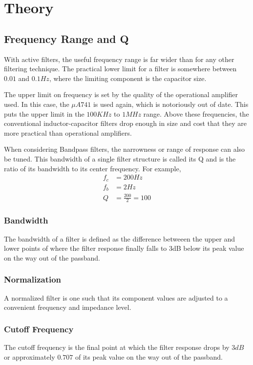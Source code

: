 \documentclass[12pt]{article}
\begin{document}
\section{Theory}
\subsection{Frequency Range and Q}
With active filters, the useful frequency range is far wider than for any other
filtering technique. The practical lower limit for a filter is somewhere between $0.01$ and $0.1Hz$, where the limiting component is the capacitor size.

The upper limit on frequency is set by the quality of the operational amplifier used. In this case, the $\mu A741$ is used again, which is notoriously out of date. This puts the upper limit in the $100KHz$ to $1MHz$ range. Above these frequencies, the conventional inductor-capacitor filters drop enough in size and cost that they are more practical than operational amplifiers.

When considering Bandpass filters, the narrowness or range of response can also be tuned. This bandwidth of a single filter structure is called its Q and is the ratio of its bandwidth to its center frequency. For example,
\begin{align*}
	f_c & = 200Hz               \\
	f_b & = 2Hz                 \\
	Q   & = \frac{200}{2} = 100
\end{align*}
\subsubsection{Bandwidth}
The bandwidth of a filter is defined as the difference betweeen the upper and lower points of where the filter response finally falls to 3dB below its peak value on the way out of the passband.

\subsubsection{Normalization}
A normalized filter is one such that its component values are adjusted to a convenient frequency and impedance level.

\subsubsection{Cutoff Frequency}
The cutoff frequency is the final point at which the filter response drops by $3 dB$ or approximately $0.707$ of its peak value on the way out of the passband.
\end{document}
